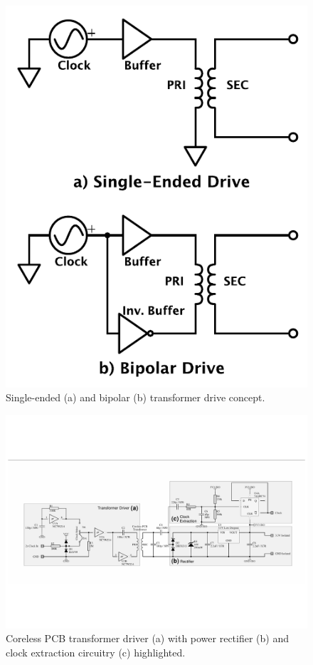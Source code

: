 \documentclass[conference]{IEEEtran}
\begin{document}
	\begin{figure}[t]
		\centering
		\includegraphics[width=0.5\columnwidth]{./img/BIvsSE}
		\caption{Single-ended (a) and bipolar (b) transformer drive concept.}
		\label{fig:BIvsSE}
	\end{figure}
%	
	\begin{figure}[t]
		\centering
		\includegraphics[width=1.0\textwidth]{./img/TFpwrclk_BW}
		\caption{Coreless PCB transformer driver (a) with power rectifier (b) and clock extraction circuitry (c) highlighted.}
		\label{fig:TFpwrclk}
	\end{figure}	
	
\end{document}
